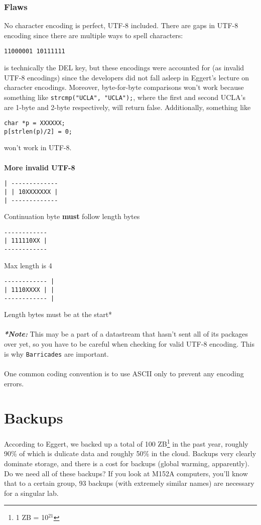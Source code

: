 \documentclass[13pt]{article}
\begin{document}
\subsubsection{Flaws}
No character encoding is perfect, UTF-8 included. There are gaps in UTF-8 encoding since there are multiple ways to spell characters:
\begin{verbatim}
11000001 10111111
\end{verbatim}
is technically the DEL key, but these encodings were accounted for (as invalid UTF-8 encodings) since the developers did not fall asleep in Eggert's lecture on character encodings. Moreover, byte-for-byte comparisons won't work because something like \texttt{strcmp("UCLA", "UCLA");}, where the first and second UCLA's are 1-byte and 2-byte respectively, will return false. Additionally, something like
\begin{verbatim}
char *p = XXXXXX;
p[strlen(p)/2] = 0;
\end{verbatim}
won't work in UTF-8. \\ \\
\textbf{More invalid UTF-8}
\begin{verbatim}
| ------------- 
| | 10XXXXXXX | 
| -------------
\end{verbatim}
Continuation byte \textbf{must} follow length bytes
\begin{verbatim}
------------
| 111110XX |
------------
\end{verbatim}
Max length is 4
\begin{verbatim}
------------ |
| 1110XXXX | |
------------ |
\end{verbatim}
Length bytes must be at the start* \\ \\
\textit{\textbf{*Note:}} This may be a part of a datastream that hasn't sent all of its packages over yet, so you have to be careful when checking for valid UTF-8 encoding. This is why \texttt{Barricades} are important. \\ \\
One common coding convention is to use ASCII only to prevent any encoding errors.





\section{Backups}
According to Eggert, we backed up a total of 100 ZB\footnote{1 ZB = 10$^{21}$} in the past year, roughly 90\% of which is dulicate data and roughly 50\% in the cloud. Backups very clearly dominate storage, and there is a cost for backups (global warming, apparently). Do we need all of these backups? If you look at M152A computers, you'll know that to a certain group, 93 backups (with extremely similar names) are necessary for a singular lab.
\end{document}
